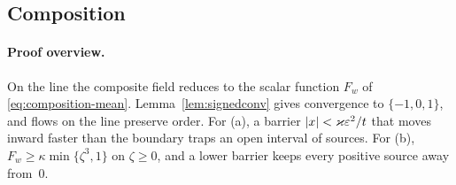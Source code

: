 \documentclass{article} %
\theoremstyle{plain}
\theoremstyle{definition}
\theoremstyle{remark}
\begin{document}
\subsection{Composition}
\label{apx:pf-composition}

\thmcomposition*
\paragraph{Proof overview.} On the line the composite field reduces to the scalar
function $F_w$ of \eqref{eq:composition-mean}. Lemma~\ref{lem:signedconv} gives convergence to
$\{-1,0,1\}$, and flows on the line preserve order. For (a), a barrier $|x|<\varkappa\varepsilon^2/t$ that
moves inward faster than the boundary traps an open interval of sources. For (b),
$F_w\ge\kappa\min\{\zeta^3,1\}$ on $\zeta\ge0$, and a lower barrier keeps every positive source away
from~$0$.
\end{document}

